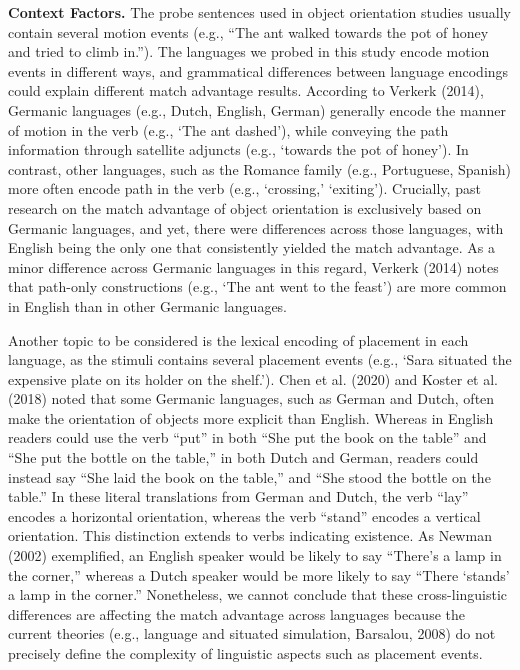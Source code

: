 \documentclass[
  man]{apa7}
\begin{document}
\textbf{Context Factors.} The probe sentences used in object orientation studies usually contain several motion events (e.g., ``The ant walked towards the pot of honey and tried to climb in.''). The languages we probed in this study encode motion events in different ways, and grammatical differences between language encodings could explain different match advantage results. According to Verkerk (2014), Germanic languages (e.g., Dutch, English, German) generally encode the manner of motion in the verb (e.g., `The ant dashed'), while conveying the path information through satellite adjuncts (e.g., `towards the pot of honey'). In contrast, other languages, such as the Romance family (e.g., Portuguese, Spanish) more often encode path in the verb (e.g., `crossing,' `exiting'). Crucially, past research on the match advantage of object orientation is exclusively based on Germanic languages, and yet, there were differences across those languages, with English being the only one that consistently yielded the match advantage. As a minor difference across Germanic languages in this regard, Verkerk (2014) notes that path-only constructions (e.g., `The ant went to the feast') are more common in English than in other Germanic languages.

Another topic to be considered is the lexical encoding of placement in each language, as the stimuli contains several placement events (e.g., `Sara situated the expensive plate on its holder on the shelf.'). Chen et al. (2020) and Koster et al. (2018) noted that some Germanic languages, such as German and Dutch, often make the orientation of objects more explicit than English. Whereas in English readers could use the verb ``put'' in both ``She put the book on the table'' and ``She put the bottle on the table,'' in both Dutch and German, readers could instead say ``She laid the book on the table,'' and ``She stood the bottle on the table.'' In these literal translations from German and Dutch, the verb ``lay'' encodes a horizontal orientation, whereas the verb ``stand'' encodes a vertical orientation. This distinction extends to verbs indicating existence. As Newman (2002) exemplified, an English speaker would be likely to say ``There's a lamp in the corner,'' whereas a Dutch speaker would be more likely to say ``There `stands' a lamp in the corner.'' Nonetheless, we cannot conclude that these cross-linguistic differences are affecting the match advantage across languages because the current theories (e.g., language and situated simulation, Barsalou, 2008) do not precisely define the complexity of linguistic aspects such as placement events.
\end{document}
